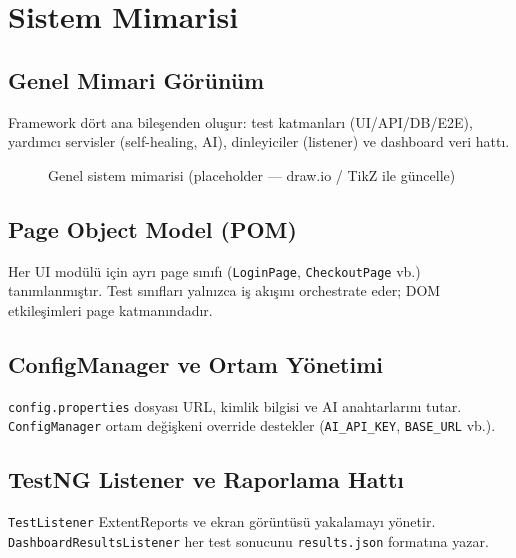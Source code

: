 \chapter{Sistem Mimarisi}

\section{Genel Mimari Görünüm}
Framework dört ana bileşenden oluşur: test katmanları (UI/API/DB/E2E), yardımcı servisler (self-healing, AI), dinleyiciler (listener) ve dashboard veri hattı.

\begin{figure}[H]
  \centering
  \caption{Genel sistem mimarisi (placeholder — draw.io / TikZ ile güncelle)}
  \label{fig:mimari}
\end{figure}

\section{Page Object Model (POM)}
Her UI modülü için ayrı page sınıfı (\texttt{LoginPage}, \texttt{CheckoutPage} vb.) tanımlanmıştır. Test sınıfları yalnızca iş akışını orchestrate eder; DOM etkileşimleri page katmanındadır.

\section{ConfigManager ve Ortam Yönetimi}
\texttt{config.properties} dosyası URL, kimlik bilgisi ve AI anahtarlarını tutar. \texttt{ConfigManager} ortam değişkeni override destekler (\texttt{AI\_API\_KEY}, \texttt{BASE\_URL} vb.).

\section{TestNG Listener ve Raporlama Hattı}
\texttt{TestListener} ExtentReports ve ekran görüntüsü yakalamayı yönetir. \texttt{DashboardResultsListener} her test sonucunu \texttt{results.json} formatına yazar.

